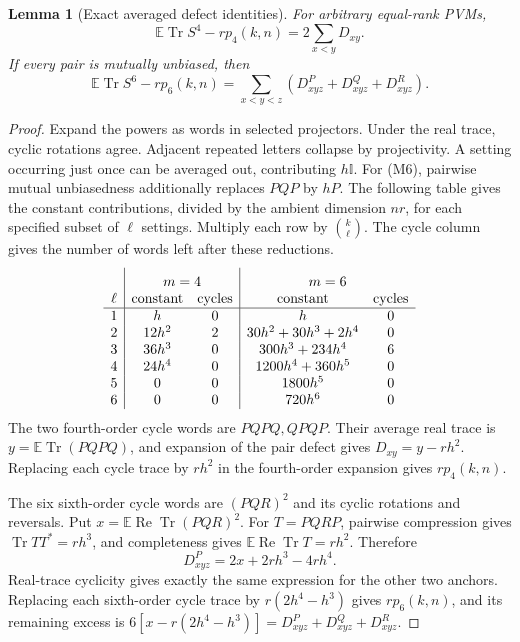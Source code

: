 \documentclass[11pt]{article}
\newtheorem{lemma}[theorem]{Lemma}
\newcommand{\id}{\mathbb I}
\begin{document}
\begin{lemma}[Exact averaged defect identities]
\label{lem:spectraldefects}
For arbitrary equal-rank PVMs,
\[
 \mathbb E\operatorname{Tr}S^4-rp_4(k,n)=2\sum_{x<y}D_{xy}.
 \tag{M4}
\]
If every pair is mutually unbiased, then
\[
 \mathbb E\operatorname{Tr}S^6-rp_6(k,n)
 =\sum_{x<y<z}(D_{xyz}^{P}+D_{xyz}^{Q}+D_{xyz}^{R}).
 \tag{M6}
\]
\end{lemma}
\begin{proof}
Expand the powers as words in selected projectors. Under the real trace,
cyclic rotations agree. Adjacent repeated letters collapse by projectivity.
A setting occurring just once can be averaged out, contributing $h\id$.
For (M6), pairwise mutual unbiasedness additionally replaces $PQP$ by $hP$.
The following table gives the constant contributions, divided by the
ambient dimension $nr$, for each specified subset of $\ell$ settings.
Multiply each row by $\binom{k}{\ell}$. The cycle column gives the
number of words left after these reductions.
\[
\begin{array}{c|cc|cc}
 &\multicolumn{2}{c|}{m=4}&\multicolumn{2}{c}{m=6}\rule{0pt}{13pt}\\
\ell&\text{constant}&\text{cycles}&\text{constant}&\text{cycles}\\\hline
1&h&0&h&0\\
2&12h^2&2&30h^2+30h^3+2h^4&0\\
3&36h^3&0&300h^3+234h^4&6\\
4&24h^4&0&1200h^4+360h^5&0\\
5&0&0&1800h^5&0\\
6&0&0&720h^6&0
\end{array}
\]
The two fourth-order cycle words are $PQPQ,QPQP$. Their average real
trace is $y=\mathbb E\operatorname{Tr}(PQPQ)$, and expansion of the
pair defect gives $D_{xy}=y-rh^2$. Replacing each cycle trace by $rh^2$
in the fourth-order expansion gives $rp_4(k,n)$.

The six sixth-order cycle words are $(PQR)^2$ and its cyclic rotations
and reversals. Put $x=\mathbb E\operatorname{Re}\operatorname{Tr}(PQR)^2$.
For $T=P Q R P$, pairwise compression gives
$\operatorname{Tr}TT^*=rh^3$, and completeness gives
$\mathbb E\operatorname{Re}\operatorname{Tr}T=rh^2$. Therefore
\[
 D_{xyz}^{P}=2x+2rh^3-4rh^4.
\]
Real-trace cyclicity gives exactly the same expression for the other
two anchors. Replacing each sixth-order cycle trace by
$r(2h^4-h^3)$ gives $rp_6(k,n)$, and its remaining excess is
$6[x-r(2h^4-h^3)]=D_{xyz}^{P}+D_{xyz}^{Q}+D_{xyz}^{R}$.


\end{proof}
\end{document}
